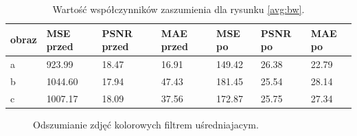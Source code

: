 \documentclass{classrep}
\begin{document}
\begin{table}[H]
	\begin{center}
		\begin{tabular}{|l|l|l|l|l|l|l|}
			\hline
			obraz & MSE przed & PSNR przed & MAE przed & MSE po & PSNR po & MAE po \\
			\hline
			a & 923.99 & 18.47 & 16.91 & 149.42 & 26.38 & 22.79 \\
			b & 1044.60 & 17.94 & 47.43 & 181.45 & 25.54 & 28.14 \\
			c & 1007.17 & 18.09 & 37.56 & 172.87 & 25.75 & 27.34 \\
			\hline
		\end{tabular}
		\caption{Wartość współczynników zaszumienia dla rysunku \ref{avg:bw}.}
			\label{avgtab:bw}
	\end{center}

\end{table}



 \begin{figure}[H]
  \centering
  \caption{Odszumianie zdjęć kolorowych filtrem uśredniajacym.}
  \label{avg:col}
\end{figure}
\end{document}
